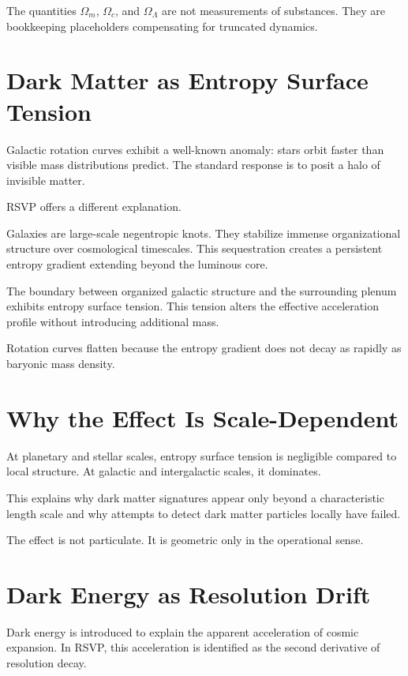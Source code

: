 \documentclass[11pt]{book}
\begin{document}
The quantities \(\Omega_m\), \(\Omega_c\), and \(\Omega_\Lambda\) are not measurements of substances. They are bookkeeping placeholders compensating for truncated dynamics.

\section{Dark Matter as Entropy Surface Tension}

Galactic rotation curves exhibit a well-known anomaly: stars orbit faster than visible mass distributions predict. The standard response is to posit a halo of invisible matter.

RSVP offers a different explanation.

Galaxies are large-scale negentropic knots. They stabilize immense organizational structure over cosmological timescales. This sequestration creates a persistent entropy gradient extending beyond the luminous core.

The boundary between organized galactic structure and the surrounding plenum exhibits entropy surface tension. This tension alters the effective acceleration profile without introducing additional mass.

Rotation curves flatten because the entropy gradient does not decay as rapidly as baryonic mass density.

\section{Why the Effect Is Scale-Dependent}

At planetary and stellar scales, entropy surface tension is negligible compared to local structure. At galactic and intergalactic scales, it dominates.

This explains why dark matter signatures appear only beyond a characteristic length scale and why attempts to detect dark matter particles locally have failed.

The effect is not particulate. It is geometric only in the operational sense.

\section{Dark Energy as Resolution Drift}

Dark energy is introduced to explain the apparent acceleration of cosmic expansion. In RSVP, this acceleration is identified as the second derivative of resolution decay.
\end{document}
